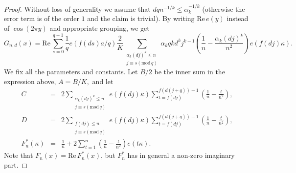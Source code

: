 \documentclass{amsart}
\numberwithin {equation}{section}
\begin{document}
\begin{proof}
Without loss of generality we assume that $dqn^{-1/k}\leq \alpha _{k}^{-1/k}$
(otherwise the error term is of the order $1$ and the claim is trivial). By
writing ${\mathrm{Re}}\,e(y)$ instead of $\cos (2\pi y)$ and appropriate
grouping, we get 
\begin{equation*}
G_{n,d}(x)={\mathrm{Re}}\,\sum_{s=0}^{q-1}\frac{1}{q}e(f(ds)a/q)\frac{2}{K}\sum_{\substack{ \alpha _{k}(dj)^{k}\leq n  \\ j\equiv s({\mathrm{mod}}\,q)}}\alpha _{k}qkd^{k}j^{k-1}\left( \frac{1}{n}-\frac{\alpha _{k}(dj)^{k}}{n^{2}}\right) e(f(dj)\kappa ).
\end{equation*}We fix all the parameters and constants. Let $B/2$ be the inner sum in the
expression above, $A=B/K,$ and let 
\begin{eqnarray*}
C &=&2\sum_{\substack{ \alpha _{k}(dj)^{k}\leq n  \\ j\equiv s({\mathrm{mod}}\,q)}}e(f(dj)\kappa )\sum_{t=f(dj)}^{f(d(j+q))-1}\left( \frac{1}{n}-\frac{t}{n^{2}}\right) , \\
D &=&2\sum_{\substack{ f(dj)\leq n  \\ j\equiv s({\mathrm{mod}}\,q)}}e(f(dj)\kappa )\sum_{t=f(dj)}^{f(d(j+q))-1}\left( \frac{1}{n}-\frac{t}{n^{2}}\right) , \\
F_{n}^{\ast }(\kappa ) &=&\frac{1}{n}+2\sum_{t=1}^{n}\left( \frac{1}{n}-\frac{t}{n^{2}}\right) e(t\kappa ).
\end{eqnarray*}Note that $F_{n}(x)={\mathrm{Re}}\,F_{n}^{\ast }(x)$, but $F_{n}^{\ast }$
has in general a non-zero imaginary part.


\end{proof}
\end{document}
